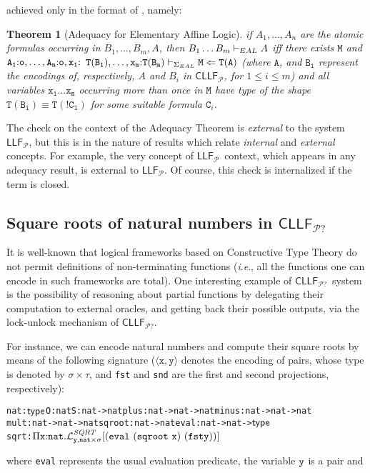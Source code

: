\documentclass[submission,copyright,creativecommons]{eptcs}
\theoremstyle{plain}
\newtheorem{theorem}{Theorem}[section]
\theoremstyle{definition}
\newcommand{\LLFP}  {\mbox{$\mathsf{LLF}_{\mathcal P}$}}
\newcommand{\CLLFP} {\mbox{$\mathsf{CLLF}_{\mathcal P}$}}
\newcommand{\CLLFPQ} {\mbox{$\mathsf{CLLF}_{\mathcal P?}$}}
\newcommand {\ie}        {{\textit{i}.\textit{e}.}}
\newcommand {\Lock}   [4] {{\mathcal{L}}^{#1}_{#2, #3}[{#4}]} \newcommand {\LockC} [3] {{\mathcal{L}}^{#1}_{#2}      [{#3}]}
\begin{document}
achieved only in the format of
\cite{HLLMSJ12}, namely:
\begin{theorem}[Adequacy for Elementary Affine Logic]
  if $A_1,\ldots,A_n$ are the atomic formulas occurring in
  $B_1,\ldots,B_m,A$, then $B_1\ldots B_m \vdash_{EAL} A $ iff there
  exists $\mathtt{M}$ and $\mathtt{A_1{:} o,\ldots,A_n{:} o,x_1{:}}$
  $\mathtt{T(B_1),\ldots,x_m{:} T(B_m)} \vdash_{\Sigma_{{EAL}}}\mathtt{M \Leftarrow
    T(A)}$
  (where $\mathtt{A}$, and $\mathtt{B_i}$ represent the encodings of,
  respectively, $A$ and $B_i$ in \CLLFP, for $1\leq i\leq m$) and all
  variables $\mathtt{x_1 \ldots x_m}$ occurring more than once in
  $\mathtt{M}$ have type of the shape
  $\mathtt{T(B_i)}\equiv \mathtt{T(!C_i)}$ for some suitable formula
  $\mathtt{C}_i$.
\end{theorem}

\noindent The check on the context of the Adequacy Theorem is {\em
  external} to the system \LLFP, but this is in the nature of results
which relate \emph{internal} and \emph{external} concepts. For
example, the very concept of \LLFP\ context, which appears in any adequacy
result, is external to \LLFP. Of course, this check is internalized if
the term is closed.

\subsection{Square roots of natural numbers in \CLLFPQ}\label{subsec:square_roots}
It is well-known that logical frameworks based on Constructive Type
Theory do not permit definitions of non-terminating functions (\ie,
all the functions one can encode in such frameworks are total). One
interesting example of \CLLFPQ\ system is the possibility of reasoning
about partial functions by delegating their computation to external
oracles, and getting back their possible outputs, via the lock-unlock
mechanism of \CLLFPQ.

For instance, we can encode natural numbers and compute their square
roots by means of the following signature
($\mathtt{{\langle} x,y{\rangle}}$ denotes the encoding of pairs,
whose type is denoted by $\mathtt{\sigma\times\tau}$, and \texttt{fst}
and \texttt{snd} are the first and second projections, respectively):
{
\begin{alltt}
nat: \(\Type\)\hfill O: nat\hfill S: nat->nat\hfill plus : nat->nat->nat\hfill minus : nat->nat->nat
mult  : nat->nat->nat\hfill   sqroot: nat->nat\hfill        eval : nat->nat->\(\Type\)
sqrt  : \(\Pi\mathtt{x\of{nat}}.\Lock{\textit{SQRT}}{\mathtt{y}}{\mathtt{nat}\times\sigma}{\mathtt{(eval\
(sqroot\ x)\ (fst y))}}\)
\end{alltt}}
\noindent where \texttt{eval} represents the usual evaluation
  predicate, the variable $\tt y$ is a pair and
\end{document}
